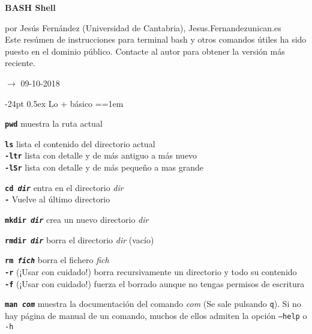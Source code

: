 \documentclass[10pt,landscape,a4paper]{article}
\makeatletter
\renewcommand\section{\@startsection{section}{1}{0mm}%
                                     {-24pt}%
                                     {0.5ex}%
                                {\normalfont\large\bfseries}}
\newcommand{\code}{\texttt}
\newcommand{\bcode}[1]{\texttt{\textbf{#1}}}
\makeatother
\begin{document}
\footnotesize
\begin{multicols}{3}

\setlength{\premulticols}{1pt}
\setlength{\postmulticols}{1pt}
\setlength{\multicolsep}{1pt}
\setlength{\columnsep}{2pt}

\begin{center}
     \Large{\textbf{BASH Shell}} \\
\end{center}
por Jesús Fernández (Universidad de Cantabria), Jesus.Fernandezunican.es\\Este resúmen de instrucciones para terminal bash y otros comandos útiles ha sido puesto en el dominio público. Contacte al autor para obtener la versión más reciente.

\hfill $\rightarrow$ 09-10-2018

\section{Lo + básico}
\everypar={\hangindent=1em}

\bcode{pwd} muestra la ruta actual

\bcode{ls} lista el contenido del directorio actual\\
  \bcode{-ltr} lista con detalle y de más antiguo a más nuevo\\
  \bcode{-lSr} lista con detalle y de más pequeño a mas grande

\bcode{cd \emph{dir}} entra en el directorio \emph{dir}\\ 
  \bcode{-} Vuelve al último directorio

\bcode{mkdir \emph{dir}} crea un nuevo directorio \emph{dir}  

\bcode{rmdir \emph{dir}} borra el directorio \emph{dir} (vacío)  

\bcode{rm \emph{fich}} borra el fichero \emph{fich}\\  
  \bcode{-r} (¡Usar con cuidado!) borra recursivamente un directorio y todo su contenido\\
  \bcode{-f} (¡Usar con cuidado!) fuerza el borrado aunque no tengas permisos de escritura

\bcode{man \emph{com}} muestra la documentación del comando \emph{com} (Se sale pulsando \code{q}). Si no hay página de manual de un comando, muchos de ellos admiten la opción \code{--help} o \code{-h}


\end{multicols}
\end{document}
